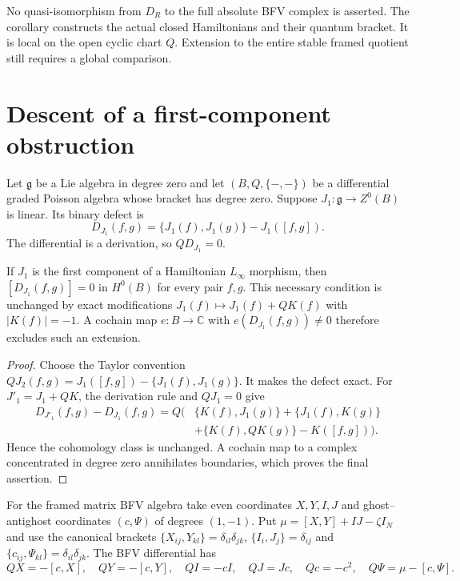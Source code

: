 No quasi-isomorphism from $D_R$ to the full absolute
BFV complex is asserted.  The corollary constructs
the actual closed Hamiltonians and their quantum
bracket.  It is local on the open cyclic chart $Q$. Extension to the entire stable framed quotient still
requires a global comparison.

\section{Descent of a first-component obstruction}
\label{mht:frgl:sec:bfv-obstruction-descent}

Let $\mathfrak g$ be a Lie algebra in degree zero and let
$(B,Q,\{-,-\})$ be a differential graded Poisson algebra whose
bracket has degree zero.  Suppose
$J_1:\mathfrak g\to Z^0(B)$ is linear.  Its binary defect is
\[
 D_{J_1}(f,g)=\{J_1(f),J_1(g)\}-J_1([f,g]).
\]
The differential is a derivation, so $QD_{J_1}=0$.

\begin{proposition}
\label{mht:frgl:prop:bfv-degree-zero-detector}
If $J_1$ is the first component of a Hamiltonian
$L_\infty$ morphism, then $[D_{J_1}(f,g)]=0$ in $H^0(B)$
for every pair $f,g$.  This necessary condition is unchanged
by exact modifications $J_1(f)\mapsto J_1(f)+QK(f)$ with
$|K(f)|=-1$.  A cochain map $e:B\to\mathbb C$ with
$e(D_{J_1}(f,g))\ne0$ therefore excludes such an extension.
\end{proposition}

\begin{proof}
Choose the Taylor convention
$QJ_2(f,g)=J_1([f,g])-\{J_1(f),J_1(g)\}$.
It makes the defect exact.  For $J'_1=J_1+QK$, the derivation
rule and $QJ_1=0$ give
\begin{align*}
 D_{J'_1}(f,g)-D_{J_1}(f,g)=Q\bigl(&
 \{K(f),J_1(g)\}+\{J_1(f),K(g)\}\\
 &+\{K(f),QK(g)\}-K([f,g])\bigr).
\end{align*}
Hence the cohomology class is unchanged.  A cochain map to a
complex concentrated in degree zero annihilates boundaries,
which proves the final assertion.
\end{proof}

For the framed matrix BFV algebra take even coordinates
$X,Y,I,J$ and ghost--antighost coordinates $(c,\Psi)$ of
degrees $(1,-1)$.  Put
$\mu=[X,Y]+IJ-\zeta I_N$ and use the canonical brackets
$\{X_{ij},Y_{kl}\}=\delta_{il}\delta_{jk}$,
$\{I_i,J_j\}=\delta_{ij}$ and
$\{c_{ij},\Psi_{kl}\}=\delta_{il}\delta_{jk}$.
The BFV differential has
\[
 QX=-[c,X],\quad QY=-[c,Y],\quad QI=-cI,
 \quad QJ=Jc,\quad Qc=-c^2,
 \quad Q\Psi=\mu-[c,\Psi].
\]

